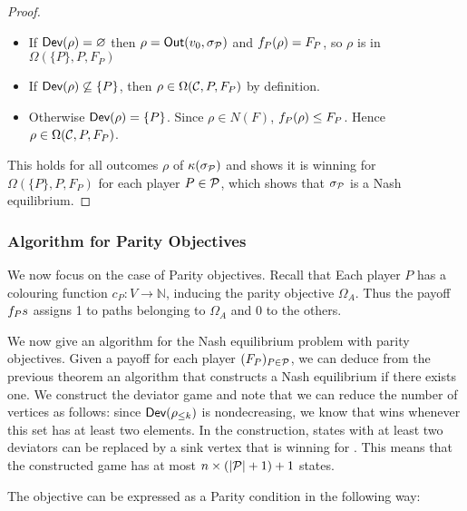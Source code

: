 \begin{proof}
\begin{itemize}

\item
  If \(\textsf{Dev}(\rho) = \varnothing\) then \(\rho = \textsf{Out}(v_0, \sigma_{\mathcal{P}})\) and
  \(f_P(\rho) = F_P\), so \(\rho\) is in
  \(\Omega(\{P\},P, F_P)\)
\item
  If \(\textsf{Dev}(\rho) \not\subseteq \{ P \}\), then
  \(\rho \in \Omega(\mathcal{C},P,F_P)\) by definition.
\item
  Otherwise \(\textsf{Dev}(\rho) = \{P\}\). Since \(\rho \in N(F)\),
  \(f_P(\rho) \le F_P\). Hence
  \(\rho \in \Omega(\mathcal{C},P,F_P)\).
\end{itemize}

This holds for all outcomes \(\rho\) of \(\kappa(\sigma_{\mathcal{P}})\) and shows
it is winning for \(\Omega(\{P\},P,F_P)\) for each
player \(P\in \mathcal{P}\), which shows that \(\sigma_{\mathcal{P}}\) is a Nash
equilibrium.
\end{proof}


\subsubsection{Algorithm for Parity
Objectives}\label{14-subsection:algorithm-for-parity-objectives}
We now focus on the case of Parity objectives.
Recall that
Each player $P$ has
a colouring function $c_P : V \rightarrow \mathbb{N}$, inducing the parity objective $\Omega_A$.
%
Thus the payoff $f_Ps$ assigns 1 to paths belonging to $\Omega_A$ and 0
to the others.

We now give an algorithm for the Nash equilibrium problem with parity
objectives. Given a payoff for each player \((F_P)_{P\in \mathcal{P}} \),
we can deduce from the previous theorem an algorithm that
constructs a Nash equilibrium if there exists one. We construct the
deviator game and note that we can reduce the number of vertices as
follows: since  \(\textsf{Dev}(\rho_{\le k})\) is nondecreasing,
we know that \Eve wins whenever this set has at least two elements.
In the construction, states with at least two deviators can be replaced by a
sink vertex that is winning for \Eve. This means that the constructed
game has at most \(n \times (|\mathcal{P}| + 1) + 1\) states.

The objective can be expressed as a Parity condition in the following
way:

